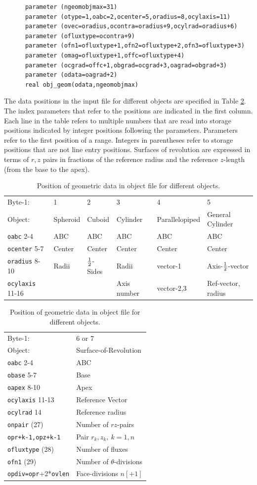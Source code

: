 \documentclass[12pt]{article}
\begin{document}
\begin{verbatim}
      parameter (ngeomobjmax=31)
      parameter (otype=1,oabc=2,ocenter=5,oradius=8,ocylaxis=11)
      parameter (ovec=oradius,ocontra=oradius+9,ocylrad=oradius+6)
      parameter (ofluxtype=ocontra+9)
      parameter (ofn1=ofluxtype+1,ofn2=ofluxtype+2,ofn3=ofluxtype+3)
      parameter (omag=ofluxtype+1,offc=ofluxtype+4)
      parameter (ocgrad=offc+1,obgrad=ocgrad+3,oagrad=obgrad+3)
      parameter (odata=oagrad+2)
      real obj_geom(odata,ngeomobjmax)
\end{verbatim}
The data positions in the input file for different objects are
specified in Table \ref{geomtable}. The index parameters that refer to
the positions are indicated in the first column. Each line in the
table refers to multiple numbers that are read into storage positions
indicated by integer positions following the parameters. Parameters
refer to the first position of a range.  Integers in parentheses refer
to storage positions that are not line entry positions. Surfaces of
revolution are expressed in terms of $r,z$ pairs in fractions of the
reference radius and the reference $z$-length (from the base to the
apex).
\begin{table}[htp]
\caption{Position of geometric data in object file for different objects.\label{geomtable}}
\begin{tabular}{|l|l|l|l|l|l|}
\hline
  Byte-1: & 1& 2& 3& 4& 5\\
  Object: & Spheroid& Cuboid& Cylinder& Parallelopiped& General
  Cylinder\\
\hline
\verb!oabc! 2-4 & ABC  & ABC  & ABC  & ABC  & ABC 
\\
\verb!ocenter! 5-7 & Center& Center& Center& Center& Center\\
\verb!oradius! 8-10 & Radii& ${1\over2}$-Sides&
Radii&  vector-1& Axis-${1\over2}$-vector\\
\verb!ocylaxis! 11-16 & & & Axis number& vector-2,3& Ref-vector, radius\\ 
\hline
\end{tabular}

\begin{tabular}{|l|l|}
\hline
  Byte-1: & 6 or 7 \\
  Object: & Surface-of-Revolution\\ 
\hline
\verb!oabc! 2-4 & ABC  \\
\verb!obase! 5-7 & Base\\
\verb!oapex! 8-10 & Apex\\
\verb!ocylaxis! 11-13 & Reference Vector\\
\verb!ocylrad! 14 & Reference radius\\
\verb!onpair! (27) & Number of $rz$-pairs \\
\verb!opr+k-1,opz+k-1! & Pair $r_k,z_k,\ k=1,n$ \\
\hline
\verb!ofluxtype! (28) & Number of fluxes \\
\verb!ofn1! (29) &  Number of $\theta$-divisions\\
\verb!opdiv=opr!+2*\verb!ovlen! & Face-divisions $n[+1]$\\
\hline
\end{tabular}
\end{table}
\end{document}
